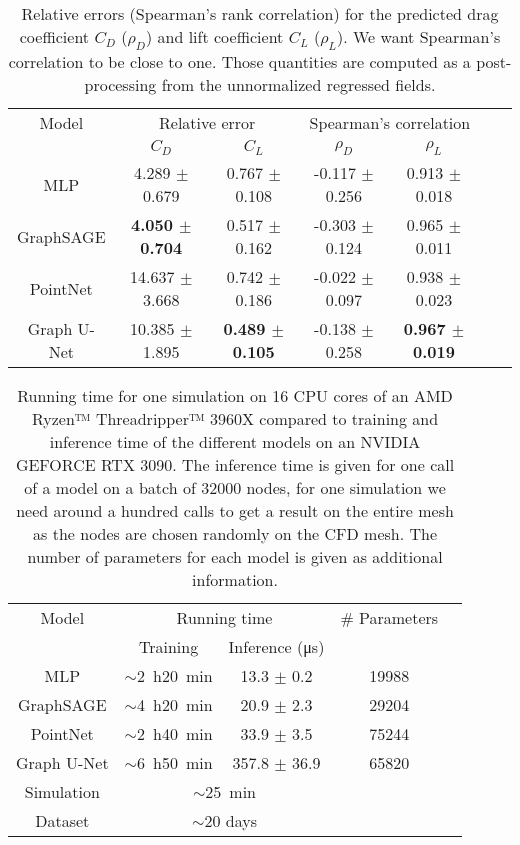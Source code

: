 \begin{table}
	\caption{Relative errors (Spearman's rank correlation) for the predicted drag coefficient $C_D$ ($\rho_D$) and lift coefficient $C_L$ ($\rho_L$). We want Spearman's correlation to be close to one. Those quantities are computed as a post-processing from the unnormalized regressed fields.}
	\label{tab:spear}
	\centering
	\begin{tabular}{ccccccc}
		\toprule
		Model & \multicolumn{2}{c}{Relative error} & \multicolumn{2}{c}{Spearman's correlation}  \\
		& $C_D$ & $C_L$ & $\rho_D$ & $\rho_L$ \\
		\midrule
		MLP & 4.289 $\pm$ 0.679 & 0.767 $\pm$ 0.108 & -0.117 $\pm$ 0.256 & 0.913 $\pm$ 0.018 \\
		GraphSAGE & \textbf{4.050 $\pm$ 0.704} & 0.517 $\pm$ 0.162 & -0.303 $\pm$ 0.124 & 0.965 $\pm$ 0.011 \\
		PointNet & 14.637 $\pm$ 3.668 & 0.742 $\pm$ 0.186 & -0.022 $\pm$ 0.097 & 0.938 $\pm$ 0.023 \\
		Graph U-Net & 10.385 $\pm$ 1.895 & \textbf{0.489 $\pm$ 0.105} & -0.138 $\pm$ 0.258 & \textbf{0.967 $\pm$ 0.019} \\
		\bottomrule
	\end{tabular}
\end{table}

\begin{table}
	\caption{Running time for one simulation on 16 CPU cores of an AMD Ryzen™ Threadripper™ 3960X compared to training and inference time of the different models on an NVIDIA GEFORCE RTX 3090. The inference time is given for one call of a model on a batch of 32000 nodes, for one simulation we need around a hundred calls to get a result on the entire mesh as the nodes are chosen randomly on the CFD mesh. The number of parameters for each model is given as additional information.}
	\label{tab:time}
	\centering
	\begin{tabular}{ccccc}
		\toprule
		Model & \multicolumn{2}{c}{Running time} & \# Parameters \\
		& Training & Inference (\si{\micro\second}) & \\
		\midrule
		MLP & $\sim$\SI{2}{\hour}\SI{20}{\minute} & 13.3 $\pm$ 0.2 & 19988 \\
		GraphSAGE & $\sim$\SI{4}{\hour}\SI{20}{\minute} & 20.9 $\pm$ 2.3 & 29204 \\
		PointNet & $\sim$\SI{2}{\hour}\SI{40}{\minute} & 33.9 $\pm$ 3.5 & 75244\\
		Graph U-Net & $\sim$\SI{6}{\hour}\SI{50}{\minute} & 357.8 $\pm$ 36.9 & 65820\\
		\midrule
		Simulation & \multicolumn{2}{c}{$\sim$\SI{25}{\minute}} &  \\
		Dataset & \multicolumn{2}{c}{$\sim$20 days} &  \\
		\bottomrule
	\end{tabular}
\end{table}

